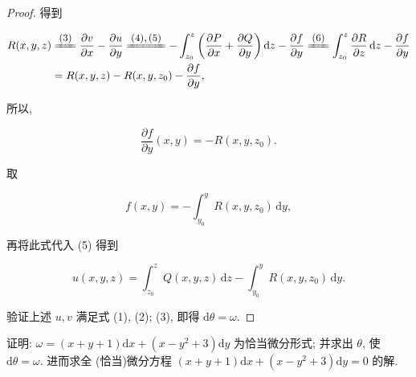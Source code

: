 \begin{proof}
得到

\[
\begin{aligned}
R(x,y,z)&\reason{$(3)$}\frac{\partial v}{\partial x}-\frac{\partial u}{\partial y}
\reason{$(4),(5)$}-\int_{z_{0}}^{z}\left(\frac{\partial P}{\partial x}+\frac{\partial Q}{\partial y}\right)\mathrm{d}z-\frac{\partial f}{\partial y}
\reason{$(6)$}\int_{z_{0}}^{z}\frac{\partial R}{\partial z}\,\mathrm{d}z-\frac{\partial f}{\partial y}\\
&=R(x,y,z)-R(x,y,z_{0})-\frac{\partial f}{\partial y},
\end{aligned}
\]

所以,

\[
\frac{\partial f}{\partial y}(x,y)=-R(x,y,z_{0}).
\]

取

\[
f(x,y)=-\int_{y_{0}}^{y}R(x,y,z_{0})\,\mathrm{d}y,
\]

再将此式代入 (5) 得到

\[
u(x,y,z)=\int_{z_{0}}^{z}Q(x,y,z)\,\mathrm{d}z-\int_{y_{0}}^{y}R(x,y,z_{0})\,\mathrm{d}y.
\]

验证上述 $u,v$ 满足式 (1), (2); (3), 即得 $\mathrm{d}\theta=\omega$.

\end{proof}

\begin{example}\label{ex:11.5.1}

证明: $\omega=(x+y+1)\mathrm{d}x+(x-y^{2}+3)\mathrm{d}y$ 为恰当微分形式; 并求出 $\theta$, 使 $\mathrm{d}\theta=\omega$. 进而求全 (恰当)微分方程 $(x+y+1)\mathrm{d}x+(x-y^{2}+3)\mathrm{d}y=0$ 的解.

\end{example}


